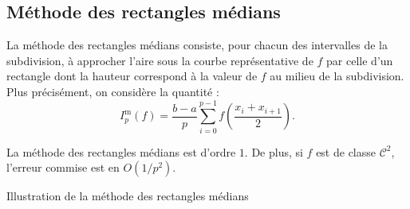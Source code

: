 \subsection{Méthode des rectangles médians}

La méthode des rectangles médians consiste, pour chacun des intervalles de la subdivision, à approcher l'aire sous la courbe représentative de $f$ par celle d'un rectangle dont la hauteur correspond à la valeur de $f$ au milieu de la subdivision. Plus précisément, on considère la quantité :
\[
I_p^\mathrm{m}(f) = \frac{b-a}{p} \sum_{i=0}^{p-1} f\left(\frac{x_i + x_{i+1}}{2} \right).
\]

\begin{prop}{}{}
La méthode des rectangles médians est d'ordre $1$. De plus, si $f$ est de classe $\mathscr{C}^2$, l'erreur commise est en $O(1/p^2)$.
\end{prop}

\begin{marginfigure}[0cm]
    \centering
    
    \caption{Illustration de la méthode des rectangles médians}
\end{marginfigure}


